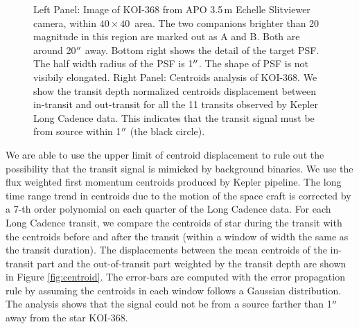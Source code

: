 \documentclass[iop]{emulateapj}
\begin{document}
\begin{figure}
\caption{
Left Panel: Image of KOI-368 from APO 3.5\,m Echelle Slitviewer 
camera, within $40\times40$\sqarcsec\ area. The two companions  
brighter than 20 magnitude in this region are marked out as A 
and B. Both are around 20$\mbox{$^{\prime\prime}$}$ away. Bottom right shows 
the detail of the target PSF. The half width radius of the 
PSF is 1$\mbox{$^{\prime\prime}$}$. The shape of PSF is not visibily elongated. 
Right Panel: Centroids analysis of KOI-368. We show the 
transit depth normalized centroids displacement between in-transit and 
out-transit for all the 11 transits observed by Kepler Long Cadence data. 
This indicates that the transit signal must be from source within 1$\mbox{$^{\prime\prime}$}$ 
(the black circle). 
\label{fig:FP}
}
\end{figure}

We are able to use the upper limit of centroid displacement to rule out the 
possibility that the transit signal is mimicked by background binaries. We 
use the flux weighted first momentum centroids produced by Kepler 
pipeline. The long time range trend in centroids due to the motion of 
the space craft is corrected by a 7-th order polynomial on each quarter 
of the Long Cadence data. For each Long Cadence transit, we compare the 
centroids of star during the transit with the centroids before and after the
transit (within a window of width the same as the transit duration). The 
displacements between the mean centroids of the in-transit part and the 
out-of-transit part weighted by the transit depth 
\citep{Chaplin:2013} are shown in Figure \ref{fig:centroid}. The error-bars 
are computed with the error propagation rule by assuming the centroids in 
each window follows a Gaussian distribution. The analysis shows that the 
signal could not be from a source farther than 1$\mbox{$^{\prime\prime}$}$ away from the star 
KOI-368.  
\end{document}
